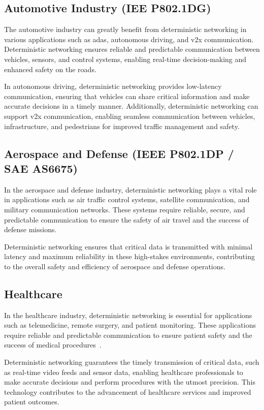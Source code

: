 \documentclass[runningheads]{llncs}
\begin{document}
\subsection{Automotive Industry (IEE P802.1DG)}
The automotive industry can greatly benefit from deterministic networking in various applications such as \gls{adas}, autonomous driving, and \gls{v2x} communication. Deterministic networking ensures reliable and predictable communication between vehicles, sensors, and control systems, enabling real-time decision-making and enhanced safety on the roads.

In autonomous driving, deterministic networking provides low-latency communication, ensuring that vehicles can share critical information and make accurate decisions in a timely manner. Additionally, deterministic networking can support \gls{v2x} communication, enabling seamless communication between vehicles, infrastructure, and pedestrians for improved traffic management and safety.

\subsection{Aerospace and Defense (IEEE P802.1DP / SAE AS6675)}
In the aerospace and defense industry, deterministic networking plays a vital role in applications such as air traffic control systems, satellite communication, and military communication networks. These systems require reliable, secure, and predictable communication to ensure the safety of air travel and the success of defense missions.

Deterministic networking ensures that critical data is transmitted with minimal latency and maximum reliability in these high-stakes environments, contributing to the overall safety and efficiency of aerospace and defense operations.

\subsection{Healthcare}
In the healthcare industry, deterministic networking is essential for applications such as telemedicine, remote surgery, and patient monitoring. These applications require reliable and predictable communication to ensure patient safety and the success of medical procedures~\cite{Zhang2022}.

Deterministic networking guarantees the timely transmission of critical data, such as real-time video feeds and sensor data, enabling healthcare professionals to make accurate decisions and perform procedures with the utmost precision. This technology contributes to the advancement of healthcare services and improved patient outcomes.
\end{document}
